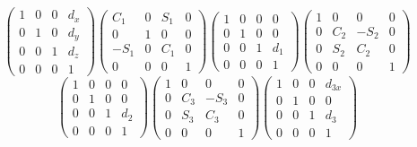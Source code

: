 \documentclass{article}
\begin{document}
$$
\begin{pmatrix}
	1&0&0&d_x\\
	0&1&0&d_y\\
	0&0&1&d_z\\
	0&0&0&1
\end{pmatrix}	
\begin{pmatrix}
	C_1&0&S_1&0\\
	0&1&0&0\\
	-S_1&0&C_1&0\\
	0&0&0&1
\end{pmatrix}	
\begin{pmatrix}
	1&0&0&0\\
	0&1&0&0\\
	0&0&1&d_1\\
	0&0&0&1
\end{pmatrix}	
\begin{pmatrix}
	1&0&0&0\\
	0&C_2&-S_2&0\\
	0&S_2&C_2&0\\
	0&0&0&1
\end{pmatrix}
$$
$$
\begin{pmatrix}
	1&0&0&0\\
	0&1&0&0\\
	0&0&1&d_2\\
	0&0&0&1
\end{pmatrix}	
\begin{pmatrix}
	1&0&0&0\\
	0&C_3&-S_3&0\\
	0&S_3&C_3&0\\
	0&0&0&1
\end{pmatrix}	
\begin{pmatrix}
	1&0&0&d_{3x}\\
	0&1&0&0\\
	0&0&1&d_3\\
	0&0&0&1
\end{pmatrix}
$$
\end{document}
